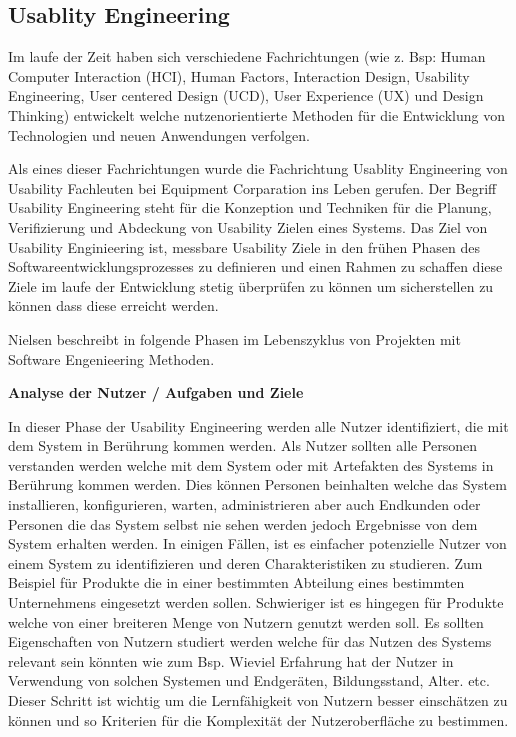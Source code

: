 
\subsection{Usablity Engineering}

\cite{MichaelRichter2016} Im laufe der Zeit haben sich verschiedene Fachrichtungen (wie z. Bsp: Human Computer Interaction (HCI), Human Factors, Interaction Design, Usability Engineering, 
User centered Design (UCD), User Experience (UX) und Design Thinking)  entwickelt welche nutzenorientierte Methoden für die Entwicklung von Technologien und neuen Anwendungen verfolgen. 

\cite{MaryBethRossonJohnM.CarrollDianeD.Cerra2002} Als eines dieser Fachrichtungen wurde die Fachrichtung Usablity Engineering von Usability Fachleuten bei Equipment Corparation ins Leben gerufen.  
Der Begriff Usability Engineering steht für die Konzeption und Techniken für die Planung, Verifizierung und Abdeckung von Usability Zielen eines Systems. Das Ziel von Usability Enginieering ist, 
messbare Usability Ziele in den frühen Phasen des Softwareentwicklungsprozesses zu definieren und einen Rahmen zu schaffen diese Ziele im laufe der Entwicklung stetig überprüfen zu können 
um sicherstellen zu können dass diese erreicht werden.

Nielsen beschreibt in \cite{Nielsen1994} folgende Phasen im Lebenszyklus von Projekten mit Software Engenieering Methoden.

\vspace{10mm}
\textbf{Analyse der Nutzer / Aufgaben und Ziele}  
 
In dieser Phase der Usability Engineering werden alle Nutzer identifiziert, die mit dem System in Berührung kommen werden. Als Nutzer sollten alle Personen verstanden werden welche mit dem 
System oder mit Artefakten des Systems in Berührung kommen werden. Dies können Personen beinhalten welche das System installieren, konfigurieren, warten, administrieren aber auch Endkunden oder 
Personen die das System selbst nie sehen werden jedoch Ergebnisse von dem System erhalten werden. In einigen Fällen, ist es einfacher potenzielle Nutzer von einem System zu identifizieren und deren 
Charakteristiken zu studieren. Zum Beispiel für Produkte die in einer bestimmten Abteilung eines bestimmten Unternehmens eingesetzt werden sollen. Schwieriger ist es hingegen für Produkte 
welche von einer breiteren Menge von Nutzern genutzt werden soll. Es sollten Eigenschaften von Nutzern studiert werden welche für das Nutzen des Systems relevant sein könnten wie zum Bsp. 
Wieviel Erfahrung  hat der Nutzer in Verwendung von solchen Systemen und Endgeräten, Bildungsstand, Alter. etc. Dieser Schritt ist wichtig um die Lernfähigkeit von Nutzern besser einschätzen zu 
können und so Kriterien für die Komplexität der Nutzeroberfläche zu bestimmen.

